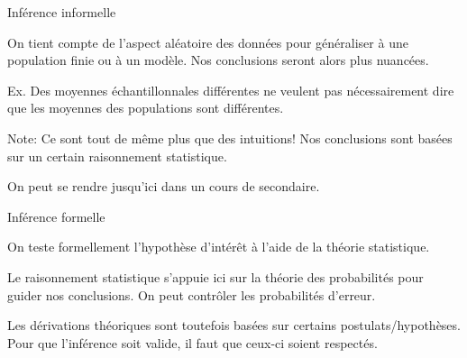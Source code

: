 \documentclass{BeamerTemplate}
\begin{document}
\begin{frame}{Inférence informelle}

\alert{On tient compte de l'aspect aléatoire des données pour généraliser à une population finie ou à un modèle. Nos conclusions seront alors plus nuancées. }

\pause

\vspace{0.1in}
{ Ex. Des moyennes échantillonnales différentes ne veulent pas nécessairement dire que les moyennes des populations sont différentes. }


\vspace{0.1in}

\pause

Note: Ce sont tout de même plus que des intuitions! Nos conclusions sont basées sur un certain raisonnement statistique.

\pause
\vspace{0.2in}
On peut se rendre jusqu'ici dans un cours de secondaire. 

\end{frame}


\begin{frame}{Inférence formelle}

\alert{On teste formellement l'hypothèse d'intérêt à l'aide de la théorie statistique. }

\pause

\vspace{0.2in}
Le raisonnement statistique s'appuie ici sur la théorie des probabilités pour guider nos conclusions. On peut contrôler les probabilités d'erreur. 

\pause

\vspace{0.2in}
Les dérivations théoriques sont toutefois basées sur certains postulats/hypothèses. Pour que l'inférence soit valide, il faut que ceux-ci soient respectés.

\end{frame}
\end{document}
